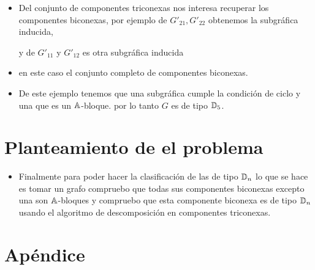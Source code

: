 \documentclass[spanish]{beamer}
\begin{document}
\begin{frame}{}
	\begin{itemize}
	\item Del conjunto de componentes triconexas nos interesa recuperar los componentes biconexas, por ejemplo de $G'_{21}, G'_{22}$ obtenemos la subgráfica inducida,   y de $G'_{11}$ y $G'_{12}$ es otra subgráfica inducida 
  \item en este caso el conjunto completo de componentes biconexas.
  \item De este ejemplo tenemos que una subgráfica cumple la condición de ciclo y una que es un $\mathbb{A}$-bloque. por lo tanto $G$ es de tipo $\mathbb{D}_{5}$.
	\end{itemize}
\end{frame}

\section{Planteamiento de el problema}
\begin{frame}{}
	\begin{itemize}
	\item Finalmente para poder hacer la clasificación de las de tipo $\mathbb{D}_{n}$ lo que se hace es tomar un grafo compruebo que todas sus componentes biconexas excepto una son $\mathbb{A}$-bloques y compruebo que esta componente biconexa es de tipo  $\mathbb{D}_{n}$  usando el algoritmo de descomposición en componentes triconexas.
	\end{itemize}
\end{frame}

\appendix

\section*{Apéndice}
\end{document}
